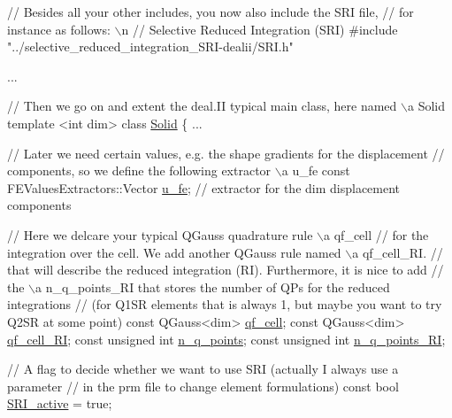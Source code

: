 \begin{DoxyCode}
\textcolor{comment}{// Besides all your other includes, you now also include the SRI file,}
\textcolor{comment}{// for instance as follows: \(\backslash\)n}
\textcolor{comment}{// Selective Reduced Integration (SRI)}
\textcolor{preprocessor}{#include "../selective\_reduced\_integration\_SRI-dealii/SRI.h"}

...

\textcolor{comment}{// Then we go on and extent the deal.II typical main class, here named \(\backslash\)a Solid}
template <\textcolor{keywordtype}{int} dim>
\textcolor{keyword}{class }\hyperlink{classSolid}{Solid}
\{
    ...
    
    \textcolor{comment}{// Later we need certain values, e.g. the shape gradients for the displacement}
    \textcolor{comment}{// components, so we define the following extractor \(\backslash\)a u\_fe}
     \textcolor{keyword}{const} FEValuesExtractors::Vector \hyperlink{classSolid_a4de5ae991dbf3dcb928d0e40b9eae6dd}{u\_fe}; \textcolor{comment}{// extractor for the dim displacement components}

    \textcolor{comment}{// Here we delcare your typical QGauss quadrature rule \(\backslash\)a qf\_cell}
    \textcolor{comment}{// for the integration over the cell. We add another QGauss rule named \(\backslash\)a qf\_cell\_RI.}
    \textcolor{comment}{// that will describe the reduced integration (RI). Furthermore, it is nice to add}
    \textcolor{comment}{// the \(\backslash\)a n\_q\_points\_RI that stores the number of QPs for the reduced integrations}
    \textcolor{comment}{// (for Q1SR elements that is always 1, but maybe you want to try Q2SR at some point)}
     \textcolor{keyword}{const} QGauss<dim>                \hyperlink{classSolid_adcd7596f6521749c8a4c7ffda312df8c}{qf\_cell};
     \textcolor{keyword}{const} QGauss<dim>                \hyperlink{classSolid_ab97c4ff4672fdb470c8a33fd0aac4650}{qf\_cell\_RI};
     \textcolor{keyword}{const} \textcolor{keywordtype}{unsigned} \textcolor{keywordtype}{int}               \hyperlink{classSolid_ae5a57e65024a6a944d6b7fdbefe7d758}{n\_q\_points};
     \textcolor{keyword}{const} \textcolor{keywordtype}{unsigned} \textcolor{keywordtype}{int}              \hyperlink{classSolid_a2a85d197b565f9a057f90e72e8d20560}{n\_q\_points\_RI};

    \textcolor{comment}{// A flag to decide whether we want to use SRI (actually I always use a parameter}
    \textcolor{comment}{// in the prm file to change element formulations)}
     \textcolor{keyword}{const} \textcolor{keywordtype}{bool} \hyperlink{classSolid_a421ff1b855d09ee75f2ea5b1a9642607}{SRI\_active} = \textcolor{keyword}{true};
     

\end{DoxyCode}
